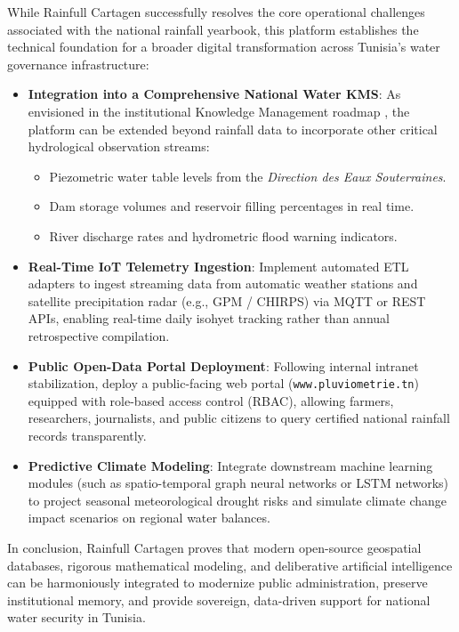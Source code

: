 \documentclass[12pt,a4paper]{report}
\begin{document}
While Rainfull Cartagen successfully resolves the core operational challenges associated with the national rainfall yearbook, this platform establishes the technical foundation for a broader digital transformation across Tunisia's water governance infrastructure:

\begin{itemize}
  \item \textbf{Integration into a Comprehensive National Water KMS}: As envisioned in the institutional Knowledge Management roadmap \cite{dalkir2017}, the platform can be extended beyond rainfall data to incorporate other critical hydrological observation streams:
  \begin{itemize}
    \item Piezometric water table levels from the \textit{Direction des Eaux Souterraines}.
    \item Dam storage volumes and reservoir filling percentages in real time.
    \item River discharge rates and hydrometric flood warning indicators.
  \end{itemize}
  \item \textbf{Real-Time IoT Telemetry Ingestion}: Implement automated ETL adapters to ingest streaming data from automatic weather stations and satellite precipitation radar (e.g., GPM / CHIRPS) via MQTT or REST APIs, enabling real-time daily isohyet tracking rather than annual retrospective compilation.
  \item \textbf{Public Open-Data Portal Deployment}: Following internal intranet stabilization, deploy a public-facing web portal (\texttt{www.pluviometrie.tn}) equipped with role-based access control (RBAC), allowing farmers, researchers, journalists, and public citizens to query certified national rainfall records transparently.
  \item \textbf{Predictive Climate Modeling}: Integrate downstream machine learning modules (such as spatio-temporal graph neural networks or LSTM networks) to project seasonal meteorological drought risks and simulate climate change impact scenarios on regional water balances.
\end{itemize}

In conclusion, Rainfull Cartagen proves that modern open-source geospatial databases, rigorous mathematical modeling, and deliberative artificial intelligence can be harmoniously integrated to modernize public administration, preserve institutional memory, and provide sovereign, data-driven support for national water security in Tunisia.
\end{document}
